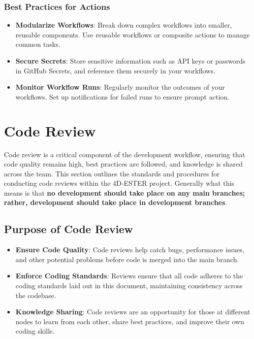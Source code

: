 \documentclass{ol-softwaremanual}
\begin{document}
\subsubsection{Best Practices for Actions}
\begin{itemize}
    \item \textbf{Modularize Workflows}: Break down complex workflows into smaller, reusable components. Use reusable workflows or composite actions to manage common tasks.
    \item \textbf{Secure Secrets}: Store sensitive information such as API keys or passwords in GitHub Secrets, and reference them securely in your workflows.
    \item \textbf{Monitor Workflow Runs}: Regularly monitor the outcomes of your workflows. Set up notifications for failed runs to ensure prompt action.
\end{itemize}
\section{Code Review}
Code review is a critical component of the development workflow, ensuring that code quality remains high, best practices are followed, and knowledge is shared across the team. This section outlines the standards and procedures for conducting code reviews within the 4D-ESTER project. Generally what this means is that \textbf{no development should take place on any main branches; rather, development should take place in development branches}.
\subsection{Purpose of Code Review}
\begin{itemize}

    \item \textbf{Ensure Code Quality}: Code reviews help catch bugs, performance issues, and other potential problems before code is merged into the main branch.
    \item \textbf{Enforce Coding Standards}: Reviews ensure that all code adheres to the coding standards laid out in this document, maintaining consistency across the codebase.
    \item \textbf{Knowledge Sharing}: Code reviews are an opportunity for those at different nodes to learn from each other, share best practices, and improve their own coding skills.
\end{itemize}
\end{document}
